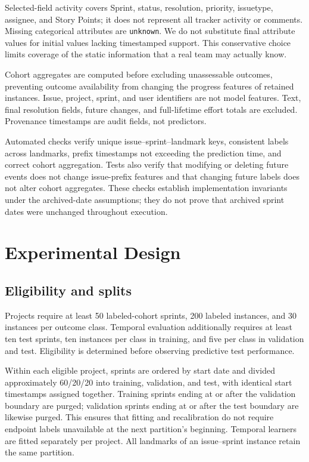 \documentclass[11pt,a4paper]{article}
\begin{document}
Selected-field activity covers Sprint, status, resolution, priority, issuetype, assignee, and Story Points; it does not represent all tracker activity or comments. Missing categorical attributes are \texttt{unknown}. We do not substitute final attribute values for initial values lacking timestamped support. This conservative choice limits coverage of the static information that a real team may actually know.

Cohort aggregates are computed before excluding unassessable outcomes, preventing outcome availability from changing the progress features of retained instances. Issue, project, sprint, and user identifiers are not model features. Text, final resolution fields, future changes, and full-lifetime effort totals are excluded. Provenance timestamps are audit fields, not predictors.

Automated checks verify unique issue--sprint--landmark keys, consistent labels across landmarks, prefix timestamps not exceeding the prediction time, and correct cohort aggregation. Tests also verify that modifying or deleting future events does not change issue-prefix features and that changing future labels does not alter cohort aggregates. These checks establish implementation invariants under the archived-date assumptions; they do not prove that archived sprint dates were unchanged throughout execution.

\section{Experimental Design}\label{experimental-design}

\subsection{Eligibility and splits}\label{eligibility-and-splits}

Projects require at least 50 labeled-cohort sprints, 200 labeled instances, and 30 instances per outcome class. Temporal evaluation additionally requires at least ten test sprints, ten instances per class in training, and five per class in validation and test. Eligibility is determined before observing predictive test performance.

Within each eligible project, sprints are ordered by start date and divided approximately 60/20/20 into training, validation, and test, with identical start timestamps assigned together. Training sprints ending at or after the validation boundary are purged; validation sprints ending at or after the test boundary are likewise purged. This ensures that fitting and recalibration do not require endpoint labels unavailable at the next partition's beginning. Temporal learners are fitted separately per project. All landmarks of an issue--sprint instance retain the same partition.
\end{document}
